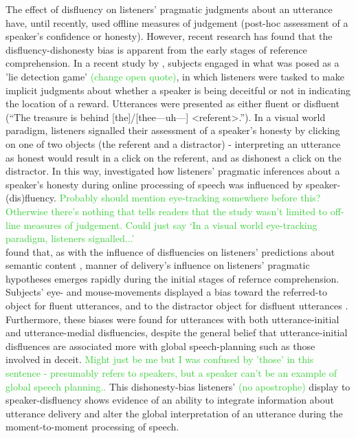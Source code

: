 \documentclass[man]{apa6}
\newcommand\thenote[1]{\textcolor{LimeGreen}{#1}}
\begin{document}
The effect of disfluency on listeners' pragmatic judgments about an utterance have, until recently, used offline measures of judgement (post-hoc assessment of a speaker's confidence or honesty). 
However, recent research has found that the disfluency-dishonesty bias is apparent from the early stages of reference comprehension. 
In a recent study by \citet{Loy2016}, subjects engaged in what was posed as a 'lie detection game' \thenote{(change open quote)}, in which listeners were tasked to make implicit judgments about whether a speaker is being deceitful or not in indicating the location of a reward.
Utterances were presented as either fluent or disfluent (``The treasure is behind [the]/[thee---uh---] \textless referent\textgreater .'').
In a visual world paradigm, listeners signalled their assessment of a speaker's honesty by clicking on one of two objects (the referent and a distractor) - interpreting an utterance as honest would result in a click on the referent, and as dishonest a click on the distractor.
In this way, \citet{Loy2016} investigated how listeners' pragmatic inferences about a speaker's honesty during online processing of speech was influenced by speaker-(dis)fluency. \thenote{Probably should mention eye-tracking somewhere before this? Otherwise there's nothing that tells readers that the study wasn't limited to off-line measures of judgement. Could just say `In a visual world eye-tracking paradigm, listeners signalled...'}\\

\citet{Loy2016} found that, as with the influence of disfluencies on listeners' predictions about semantic content \citep{Arnold2004, Arnold2007, Barr2001}, manner of delivery's influence on listeners' pragmatic hypotheses emerges rapidly during the initial stages of refernce comprehension. 
Subjects' eye- and mouse-movements displayed a bias toward the referred-to object for fluent utterances, and to the distractor object for disfluent utterances \citep{Loy2016}.
Furthermore, these biases were found for utterances with both utterance-initial and utterance-medial disfluencies, despite the general belief that utterance-initial disfluences are associated more with global speech-planning such as those involved in deceit. \thenote{Might just be me but I was confused by 'those' in this sentence - presumably refers to speakers, but a speaker can't be an example of global speech planning..}
This dishonesty-bias listeners' \thenote{(no apostrophe)} display to speaker-disfluency shows evidence of an ability to integrate information about utterance delivery and alter the global interpretation of an utterance during the moment-to-moment processing of speech.\\
\end{document}
